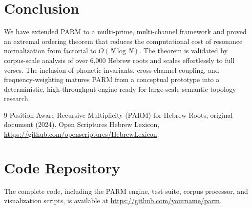 \documentclass[12pt, a4paper]{article}
\begin{document}
\section{Conclusion}

We have extended PARM to a multi-prime, multi-channel framework and proved an extremal ordering theorem that reduces the computational cost of resonance normalization from factorial to $O(N \log N)$. The theorem is validated by corpus-scale analysis of over 6,000 Hebrew roots and scales effortlessly to full verses. The inclusion of phonetic invariants, cross-channel coupling, and frequency-weighting matures PARM from a conceptual prototype into a deterministic, high-throughput engine ready for large-scale semantic topology research.


\begin{thebibliography}{9}
 Position-Aware Recursive Multiplicity (PARM) for Hebrew Roots, original document (2024).
 Open Scriptures Hebrew Lexicon, \url{https://github.com/openscriptures/HebrewLexicon}.
\end{thebibliography}

\appendix
\section{Code Repository}
The complete code, including the PARM engine, test suite, corpus processor, and visualization scripts, is available at \url{https://github.com/yourname/parm}.
\end{document}
